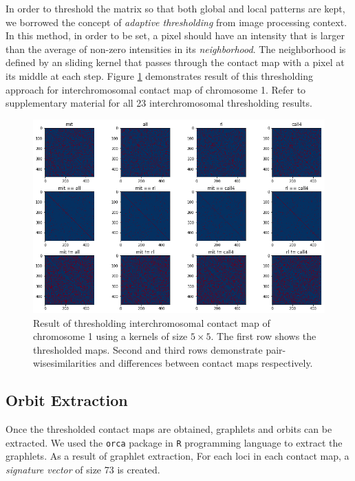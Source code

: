 \documentclass[a4,center,fleqn]{NAR}
\begin{document}
In order to threshold the matrix so that both global and local patterns are
kept, we borrowed the concept of \textit{adaptive thresholding} from image 
processing context. In this method, in order to be set, a pixel should have
an intensity that is larger than the average of non-zero intensities in its
\textit{neighborhood}. The neighborhood is defined by an sliding kernel 
that passes through the contact map with a pixel at its middle at 
each step. Figure \ref{local_thresholded_chr1_chr1} demonstrates result of 
this thresholding approach for interchromosomal contact map of chromosome 1.
Refer to supplementary material for all 23 interchromosomal thresholding
results.
\begin{figure}[t]
    \centering
    \includegraphics[width=\textwidth]{figures/local_thresholded_chr1_chr1.png}
    \caption{Result of thresholding interchromosomal contact map of chromosome 1
    using a kernels of size $5 \times 5$. The first row shows the thresholded
    maps. Second and third rows demonstrate pair-wisesimilarities and 
    differences between contact maps respectively.}
    \label{local_thresholded_chr1_chr1}
\end{figure}

\subsection{Orbit Extraction}
Once the thresholded contact maps are obtained, graphlets and orbits can be 
extracted. We used the \texttt{orca} package in \texttt{R} programming 
language to extract the graphlets. As a result of graphlet extraction, 
For each loci in each contact map, a \textit{signature vector} of size
73 is created.
\end{document}
